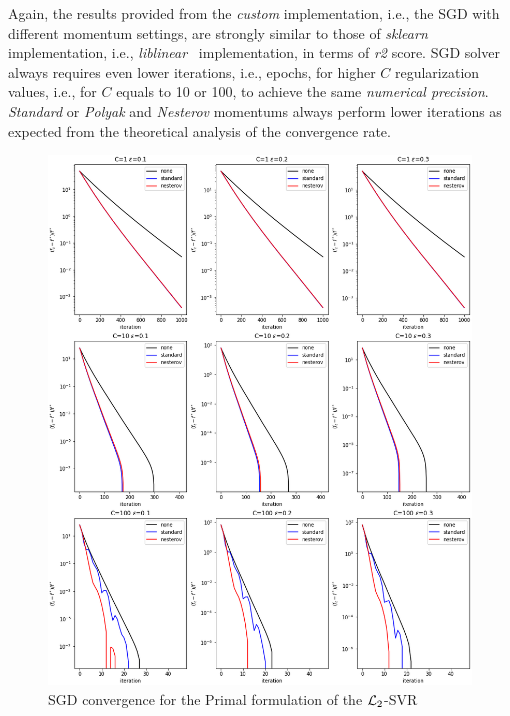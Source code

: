 

Again, the results provided from the \emph{custom} implementation, i.e., the SGD with different momentum settings, are strongly similar to those of \emph{sklearn} implementation, i.e., \emph{liblinear}~\cite{fan2008liblinear} implementation, in terms of \emph{r2} score. SGD solver always requires even lower iterations, i.e., epochs, for higher $C$ regularization values, i.e., for $C$ equals to 10 or 100, to achieve the same \emph{numerical precision}. \emph{Standard} or \emph{Polyak} and \emph{Nesterov} momentums always perform lower iterations as expected from the theoretical analysis of the convergence rate.

\begin{figure}[H]
	\centering
	\includegraphics[scale=0.5]{img/l2_svr_loss_history}
	\caption{SGD convergence for the Primal formulation of the $\protect \mathcal{L}_2$-SVR}
	\label{fig:l2_svr_loss_history}
\end{figure}

